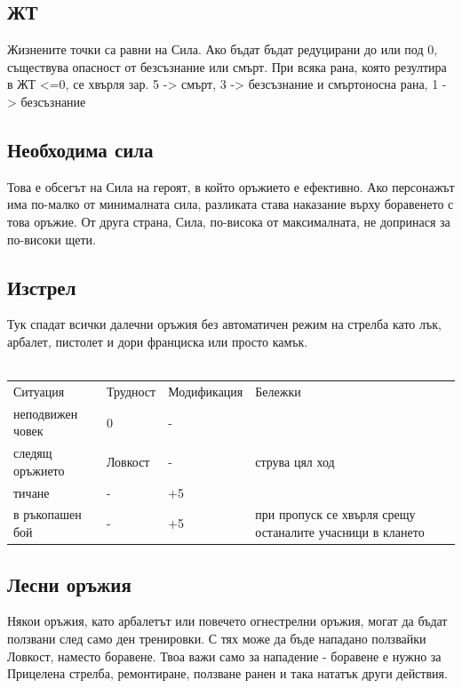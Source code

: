 \subsection{ЖТ}
Жизнените точки са равни на Сила.
Ако бъдат бъдат редуцирани до или под 0, съществува опасност от безсъзнание или смърт.
При всяка рана, която резултира в ЖТ <=0, се хвърля зар.
5 -> смърт, 3 -> безсъзнание и смъртоносна рана, 1 -> безсъзнание


\subsection{Необходима сила}
Това е обсегът на Сила на героят, в който оръжието е ефективно.
Ако персонажът има по-малко от минималната сила, разликата става наказание върху боравенето с това оръжие.
От друга страна, Сила, по-висока от максималната, не допринася за по-високи щети.


\subsection{Изстрел}
Тук спадат всички далечни оръжия без автоматичен режим на стрелба като лък, арбалет, пистолет и дори франциска или просто камък.
\\
\\
\begin{tabular}{l | l | l | l }
Ситуация         & Трудност & Модификация & Бележки                                                    \\
неподвижен човек & 0        & -           &                                                            \\
следящ оръжието  & Ловкост  & -           & струва цял ход                                             \\
тичане           & -        & +5          &                                                            \\
в ръкопашен бой  & -        & +5          & при пропуск се хвърля срещу останалите учасници в клането  \\
\end{tabular}


\subsection{Лесни оръжия}
Някои оръжия, като арбалетът или повечето огнестрелни оръжия, могат да бъдат ползвани след само ден тренировки.
С тях може да бъде нападано ползвайки Ловкост, наместо боравене.
Твоа важи само за нападение - боравене е нужно за Прицелена стрелба, ремонтиране, ползване ранен и така нататък други действия.



